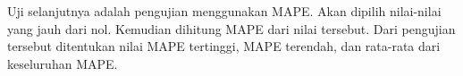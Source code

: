 Uji selanjutnya adalah pengujian menggunakan MAPE. Akan dipilih nilai-nilai yang jauh dari nol. Kemudian dihitung MAPE dari nilai tersebut. Dari pengujian tersebut ditentukan nilai MAPE tertinggi, MAPE terendah, dan rata-rata dari keseluruhan MAPE.


